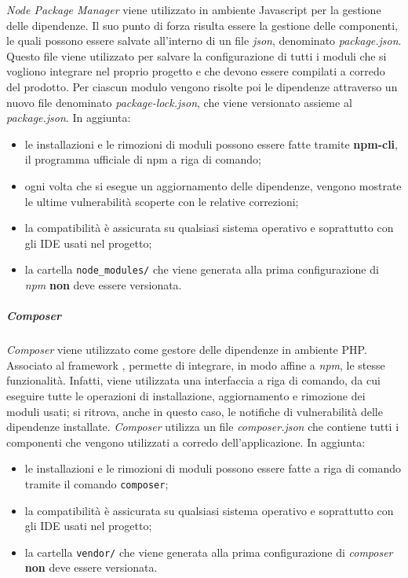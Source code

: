 		\textit{Node Package Manager} viene utilizzato in ambiente Javascript per la gestione delle dipendenze.
		\newline
		Il suo punto di forza risulta essere la gestione delle componenti, le quali possono essere salvate all'interno di un file \textit{json}, denominato \textit{package.json}.
		\newline
		Questo file viene utilizzato per salvare la configurazione di tutti i moduli che si vogliono integrare nel proprio progetto e che devono essere compilati a corredo del prodotto.
		\newline
		Per ciascun modulo vengono risolte poi le dipendenze attraverso un nuovo file denominato \textit{package-lock.json}, che viene versionato assieme al \textit{package.json}. In aggiunta:
		\begin{itemize}
			\item le installazioni e le rimozioni di moduli possono essere fatte tramite \textbf{npm-cli}, il programma ufficiale di npm a riga di comando;
			\item ogni volta che si esegue un aggiornamento delle dipendenze, vengono mostrate le ultime vulnerabilità scoperte con le relative correzioni;
			\item la compatibilità è assicurata su qualsiasi sistema operativo e soprattutto con gli IDE usati nel progetto;
			\item la cartella \verb!node_modules/! che viene generata alla prima configurazione di \textit{npm} \textbf{non} deve essere versionata.
		\end{itemize}

		\subparagraph{Composer}

		\textit{Composer} viene utilizzato come gestore delle dipendenze in ambiente PHP.
		\newline
		Associato al framework , permette di integrare, in modo affine a \textit{npm}, le stesse funzionalità.
		\newline
		Infatti, viene utilizzata una interfaccia a riga di comando, da cui eseguire tutte le operazioni di installazione, aggiornamento e rimozione dei moduli usati; si ritrova, anche in questo caso, le notifiche di vulnerabilità delle dipendenze installate.
		\newline
		\textit{Composer} utilizza un file \textit{composer.json} che contiene tutti i componenti che vengono utilizzati a corredo dell'applicazione. In aggiunta:
		\begin{itemize}
			\item le installazioni e le rimozioni di moduli possono essere fatte a riga di comando tramite il comando \verb!composer!;
			\item la compatibilità è assicurata su qualsiasi sistema operativo e soprattutto con gli IDE usati nel progetto;
			\item la cartella \verb!vendor/! che viene generata alla prima configurazione di \textit{composer} \textbf{non} deve essere versionata.
		\end{itemize}



